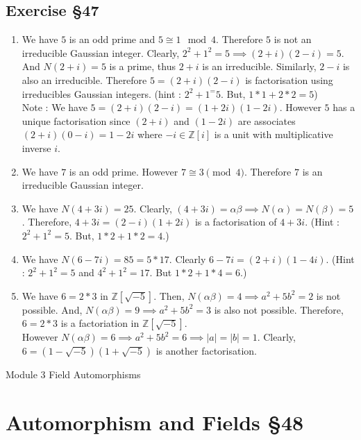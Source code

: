 \subsection{Exercise \S47}
\begin{enumerate}
	\item We have $5$ is an odd prime and  $5 \cong 1 \mod{4}$.
		Therefore $5$ is not an irreducible Gaussian integer.
		Clearly, $2^2+1^2 = 5 \implies (2+i)(2-i) = 5$.\\

		And $N(2+i) = 5$ is a prime, thus $2+i$ is an irreducible.
		Similarly, $2-i$ is also an irreducible.
		Therefore $5 = (2+i)(2-i)$ is factorisation using irreducibles Gaussian integers.
		(hint : $2^2+1^ = 5$. But, $1 \ast 1 + 2 \ast 2 = 5$)\\

		Note : We have $ 5 = (2+i)(2-i) = (1+2i)(1-2i)$.
		However $5$ has a unique factorisation since $(2+i)$ and $(1-2i)$ are associates $(2+i)(0-i) = 1-2i$ where $-i \in \mathbb{Z}[i]$ is a unit with multiplicative inverse $i$.

	\item We have $7$ is an odd prime.
		However $7 \cong 3 \pmod{4}$.
		Therefore $7$ is an irreducible Gaussian integer.
	\item We have $N(4+3i) = 25$.
		Clearly, $(4+3i) = \alpha\beta \implies N(\alpha) = N(\beta) = 5$.
		Therefore, $4+3i = (2-i)(1+2i)$ is a factorisation of $4+3i$.
		(Hint : $2^2+1^2 = 5$. But, $1 \ast 2 + 1 \ast 2 = 4$.)
	\item We have $N(6-7i) = 85 = 5 \ast 17$.
		Clearly $6-7i = (2+i)(1-4i)$.
		(Hint : $2^2+1^2 = 5$ and $4^2+1^2 = 17$. But $1 \ast 2 + 1 \ast 4 = 6$.)
	\item We have $6 = 2 \ast 3$ in $\mathbb{Z}[\sqrt{-5}]$.
		Then, $N(\alpha\beta) = 4 \implies a^2+5b^2 = 2$ is not possible.
		And, $N(\alpha\beta)= 9 \implies a^2+5b^2 = 3$ is also not possible. Therefore, $6 = 2 \ast 3$ is a factoriation in $\mathbb{Z}[\sqrt{-5}]$.\\

		However $N(\alpha\beta) = 6 \implies a^2 + 5b^2 = 6 \implies |a| = |b| = 1$.
		Clearly, $6 = (1-\sqrt{-5})(1+\sqrt{-5})$ is another factorisation.
\end{enumerate}
\pagebreak
{\Large Module 3 Field Automorphisms}
\section{Automorphism and Fields \S48}

